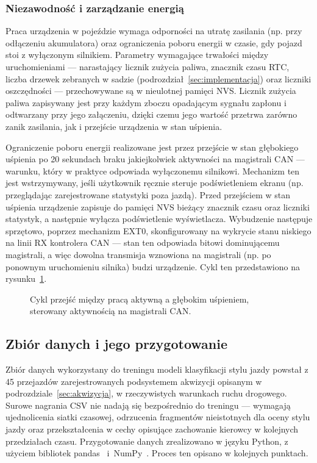 \subsubsection{Niezawodność i zarządzanie energią}

Praca urządzenia w pojeździe wymaga odporności na utratę zasilania (np. przy
odłączeniu akumulatora) oraz ograniczenia poboru energii w czasie, gdy pojazd
stoi z wyłączonym silnikiem. Parametry wymagające trwałości między
uruchomieniami --- narastający licznik zużycia paliwa, znacznik czasu RTC,
liczba drzewek zebranych w sadzie (podrozdział~\ref{sec:implementacja}) oraz
liczniki oszczędności --- przechowywane są w nieulotnej pamięci NVS. Licznik
zużycia paliwa zapisywany jest przy każdym zboczu opadającym sygnału zapłonu
i odtwarzany przy jego załączeniu, dzięki czemu jego wartość przetrwa zarówno
zanik zasilania, jak i przejście urządzenia w stan uśpienia.

Ograniczenie poboru energii realizowane jest przez przejście w stan
głębokiego uśpienia po 20 sekundach braku jakiejkolwiek aktywności na
magistrali CAN --- warunku, który w praktyce odpowiada wyłączonemu silnikowi.
Mechanizm ten jest wstrzymywany, jeśli użytkownik ręcznie steruje
podświetleniem ekranu (np. przeglądając zarejestrowane statystyki poza jazdą).
Przed przejściem w stan uśpienia urządzenie zapisuje do pamięci NVS bieżący
znacznik czasu oraz liczniki statystyk, a następnie wyłącza podświetlenie
wyświetlacza. Wybudzenie następuje sprzętowo, poprzez mechanizm EXT0,
skonfigurowany na wykrycie stanu niskiego na linii RX kontrolera CAN --- stan
ten odpowiada bitowi dominującemu magistrali, a więc dowolna transmisja
wznowiona na magistrali (np. po ponownym uruchomieniu silnika) budzi
urządzenie. Cykl ten przedstawiono na rysunku~\ref{fig:cykl-snu}.

\begin{figure}[!h]
    \centering
    \resizebox{0.8\linewidth}{!}{}
    \caption{Cykl przejść między pracą aktywną a głębokim uśpieniem, sterowany aktywnością na magistrali CAN.}
    \label{fig:cykl-snu}
\end{figure}

\subsection{Zbiór danych i jego przygotowanie}
\label{sec:dane}

Zbiór danych wykorzystany do treningu modeli klasyfikacji stylu jazdy
powstał z 45 przejazdów zarejestrowanych podsystemem akwizycji opisanym
w podrozdziale~\ref{sec:akwizycja}, w rzeczywistych warunkach ruchu
drogowego. Surowe nagrania CSV nie nadają się bezpośrednio do treningu ---
wymagają ujednolicenia siatki czasowej, odrzucenia fragmentów nieistotnych
dla oceny stylu jazdy oraz przekształcenia w cechy opisujące zachowanie
kierowcy w kolejnych przedziałach czasu. Przygotowanie danych zrealizowano
w języku Python, z użyciem bibliotek pandas~\cite{pandas}
i~NumPy~\cite{numpy}. Proces ten opisano w kolejnych punktach.

